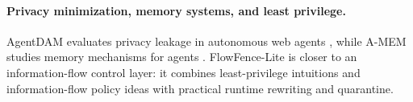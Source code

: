 \paragraph{Privacy minimization, memory systems, and least privilege.}
AgentDAM evaluates privacy leakage in autonomous web agents \citep{zharmagambetov2025agentdam}, while A-MEM studies memory mechanisms for agents \citep{xu2025amem}. FlowFence-Lite is closer to an information-flow control layer: it combines least-privilege intuitions \citep{saltzer1975protection} and information-flow policy ideas \citep{denning1976lattice} with practical runtime rewriting and quarantine.
